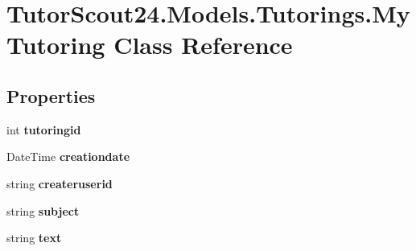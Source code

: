 \hypertarget{class_tutor_scout24_1_1_models_1_1_tutorings_1_1_my_tutoring}{}\section{Tutor\+Scout24.\+Models.\+Tutorings.\+My\+Tutoring Class Reference}
\label{class_tutor_scout24_1_1_models_1_1_tutorings_1_1_my_tutoring}
\subsection*{Properties}
\begin{DoxyCompactItemize}
\item 
\mbox{\label{class_tutor_scout24_1_1_models_1_1_tutorings_1_1_my_tutoring_a61fa6796e118745f67ff8376c6a1af12}} 
int {\bfseries tutoringid}
\item 
\mbox{\label{class_tutor_scout24_1_1_models_1_1_tutorings_1_1_my_tutoring_ab352f56b389367200aed93779cc92eb8}} 
Date\+Time {\bfseries creationdate}
\item 
\mbox{\label{class_tutor_scout24_1_1_models_1_1_tutorings_1_1_my_tutoring_a6e787ed5b35367c9bf36ddefa4d5a98f}} 
string {\bfseries createruserid}
\item 
\mbox{\label{class_tutor_scout24_1_1_models_1_1_tutorings_1_1_my_tutoring_a26a3f300a35c8f7445a17040c03ef7fc}} 
string {\bfseries subject}
\item 
\mbox{\label{class_tutor_scout24_1_1_models_1_1_tutorings_1_1_my_tutoring_a2c63ed2f71c2da939f5eeb1a18916a18}} 
string {\bfseries text}

\end{DoxyCompactItemize}
